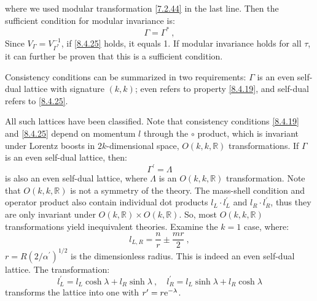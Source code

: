 where we used modular transformation \eqref{7.2.44} in the last line. 
Then the sufficient condition for modular invariance is:
\begin{equation}
	\Gamma=\Gamma^{*} \:, \label{8.4.25}
\end{equation}
Since $V_{\Gamma}=V_{\Gamma^{*}}^{-1}$, if \eqref{8.4.25} holds, it equals 1. If modular invariance holds for all $\tau$, it can further be proven that this is a sufficient condition.

Consistency conditions can be summarized in two requirements: $\Gamma$ is an even self-dual lattice with signature $(k, k)$; even refers to property \eqref{8.4.19}, and self-dual refers to \eqref{8.4.25}.

All such lattices have been classified. 
Note that consistency conditions \eqref{8.4.19} and \eqref{8.4.25} depend on momentum $l$ through the $\vysmwhtcircle$ product, 
which is invariant under Lorentz boosts in $2 k$-dimensional space, $O(k, k, \mathds{R})$ transformations. If $\Gamma$ is an even self-dual lattice, then:
\begin{equation}
	\Gamma^{\prime}=\Lambda \label{8.4.26}
\end{equation}
is also an even self-dual lattice, where $\Lambda $ is an $O(k, k, \mathds{R})$ transformation. Note that $O(k, k, \mathds{R})$ is not a symmetry of the theory. 
The mass-shell condition and operator product also contain individual dot products $l_{L} \cdot l_{L}^{\prime}$ and $l_{R} \cdot l_{R}^{\prime}$, thus they are only invariant under $O(k, \mathds{R}) \times O(k, \mathds{R})$. So, 
most $O(k, k, \mathds{R})$ transformations yield inequivalent theories. 
Examine the $k=1$ case, where:
\begin{equation}
	l_{L, R}=\frac{n}{r} \pm \frac{m r}{2} \:, \label{8.4.27}
\end{equation}
$r=R(2 / \alpha^{\prime})^{1 / 2}$ is the dimensionless radius. This is indeed an even self-dual lattice. 
The transformation:
\begin{equation}
	l_{L}^{\prime}=l_{L} \cosh \lambda+l_{R} \sinh \lambda\:, \quad l_{R}^{\prime}=l_{L} \sinh \lambda+l_{R} \cosh \lambda \label{8.4.28}
\end{equation}
transforms the lattice into one with $r^{\prime}=r \mathrm{e}^{-\lambda}$.

